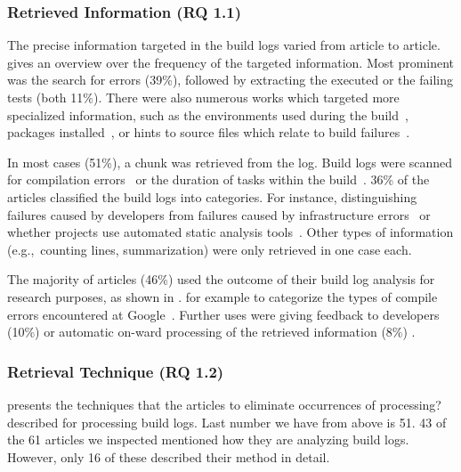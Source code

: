 \subsubsection{Retrieved Information (RQ 1.1)}

The precise information targeted in the build logs varied from article
to article.
 gives an overview over the frequency of
the targeted information.
Most prominent was the search for errors (39\%), followed by extracting
the executed or the failing
tests (both 11\%).
There were also numerous works which targeted more specialized
information, such as the environments used during the
build~\cite{zolfagharinia2017not}, packages
installed~\cite{selberg2012use}, or hints to source files which
relate to build failures~\cite{ren2018automated}.

In most cases (51\%), a chunk was retrieved from the log.
Build logs were scanned for compilation
errors~\cite{clemencic2014new} or
the duration of tasks within the build~\cite{zhang2016android}.
36\% of the articles classified the build logs into categories.
For instance, distinguishing failures caused by developers from
failures caused
by infrastructure errors~\cite{lindqvist2019detection} or
whether projects use automated static analysis
tools~\cite{kavaler2019tool}.
Other types of information (e.g.,\ counting
lines, summarization) were only retrieved
in one case each.

The majority of articles (46\%) used the outcome of their build log
analysis for research purposes, as shown in .
for example to categorize the types of compile errors encountered at
Google~\cite{}.
Further uses were giving feedback to developers (10\%) or automatic
on-ward processing of the retrieved information (8\%)
.

\subsubsection{Retrieval Technique (RQ 1.2)}
 presents the techniques that the articles
to eliminate occurrences of processing?
described for processing build logs.
Last number we have from above is 51.
43 of the 61 articles we inspected mentioned how they are analyzing build
logs.
However, only 16 of these described their method in detail.

